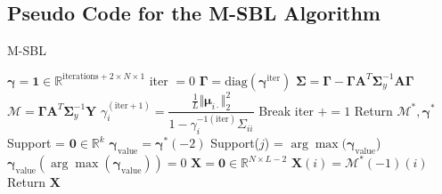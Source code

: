 \subsection{Pseudo Code for the M-SBL Algorithm}
\begin{algorithm}[H]
\caption{M-SBL}
\begin{algorithmic}[1]
\State $\boldsymbol{\gamma} = \mathbf{1} \in \mathbb{R}^{\text{iterations} + 2 \times N \times 1}$
\State iter $= 0$
	\State $\boldsymbol{\Gamma} = \text{diag}(\boldsymbol{\gamma}^\text{iter})$
		\State $\boldsymbol{\Sigma} = \boldsymbol{\Gamma} - \boldsymbol{\Gamma} \mathbf{A}^T \boldsymbol{\Sigma}_y^{-1} \mathbf{A} \boldsymbol{\Gamma}$
		\State $\mathcal{M} = \boldsymbol{\Gamma} \mathbf{A}^T \boldsymbol{\Sigma}_y^{-1} \mathbf{Y}$
		\State $\gamma_i^{(\text{iter} + 1)} = \dfrac{\frac{1}{L} \Vert \boldsymbol{\mu}_{i \cdot} \Vert_2^2}{1 - \gamma_i^{-1 (\text{iter})} \Sigma_{ii}}$
	\EndFor
		\State Break
	\EndIf
	\State iter $+= 1$
\EndWhile
\State Return $\mathcal{M}^\ast, \boldsymbol{\gamma}^\ast$
\EndProcedure
{}
\State Support = $\mathbf{0} \in \mathbb{R}^{k}$
\State $\boldsymbol{\gamma}_{\text{value}} = \boldsymbol{\gamma}^\ast (-2)$
		\State Support($j$) = $\arg \max (\boldsymbol{\gamma}_{\text{value}}$)
		\State $\boldsymbol{\gamma}_{\text{value}}(\arg \max (\boldsymbol{\gamma}_{\text{value}})) = 0$
	\EndIf
\EndFor
\State $\mathbf{X} = \mathbf{0} \in \mathbb{R}^{N \times L-2}$
	\State $\mathbf{X}(i) = \mathcal{M}^\ast(-1)(i)$
\EndFor
\State Return $\mathbf{X}$
\EndProcedure
\end{algorithmic}
\end{algorithm}

